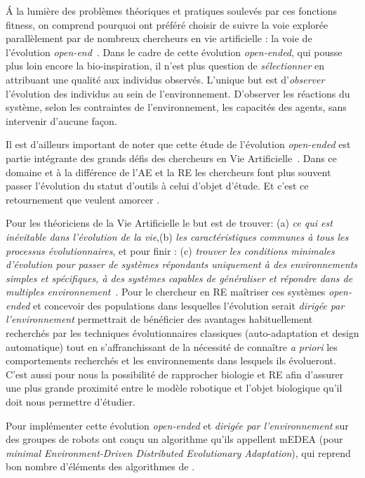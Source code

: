 \'A la lumière des problèmes théoriques et pratiques soulevés par ces fonctions fitness, on comprend pourquoi \cite{bredeche2012environmentdrivenopenende} ont préféré choisir de suivre la voie explorée parallèlement par de nombreux chercheurs en vie artificielle : la voie de l'évolution \emph{open-end}~\citep{ray91anapproachtothesynthesisoflife,adami94evolutionarylearninginthe2Dartificiallifesystemavida}. Dans le cadre de cette évolution \emph{open-ended}, qui pousse plus loin encore la bio-inspiration, il n'est plus question de \emph{sélectionner} en attribuant une qualité aux individus observés. L'unique but est d'\emph{observer} l'évolution des individus au sein de l'environnement. D'observer les réactions du système, selon les contraintes de l'environnement, les capacités des agents, sans intervenir d'aucune fa\c con.

Il est d'ailleurs important de noter que cette étude de l'évolution \emph{open-ended} est partie intégrante des grands défis des chercheurs en Vie Artificielle~\citep{bedau2000openproblemsinartificiallife}. Dans ce domaine et à la différence de l'AE et la RE les chercheurs font plus souvent passer l'évolution du statut d'outils à celui d'objet d'étude. Et c'est ce retournement que veulent amorcer \cite{bredeche11mcmds}.

Pour les théoriciens de la Vie Artificielle le but est de trouver: (a) \emph{ce qui est inévitable dans l'évolution de la vie},(b) \emph{les caractéristiques communes à tous les processus évolutionnaires}, et pour finir : (c) \emph{trouver les conditions minimales d'évolution pour passer de systèmes répondants uniquement à des environnements simples et spécifiques, à des systèmes capables de généraliser et répondre dans de multiples environnement}~\citep[voir respectivement les chapitres 3.6, 3.10 et 3.7 ]{bedau2000openproblemsinartificiallife}.
Pour le chercheur en RE maîtriser ces systèmes \emph{open-ended} et concevoir des populations dans lesquelles l'évolution serait \emph{dirigée par l'environnement} permettrait de bénéficier des avantages habituellement recherchés par les techniques évolutionnaires classiques (auto-adaptation et design automatique) tout en s'affranchissant de la nécessité de connaître \emph{a priori} les comportements recherchés et les environnements dans lesquels ils évolueront. C'est aussi pour nous la possibilité de rapprocher biologie et RE afin d'assurer une plus grande proximité entre le modèle robotique et l'objet biologique qu'il doit nous permettre d'étudier.

Pour implémenter cette évolution \emph{open-ended} et \emph{dirigée par l'environnement} sur des groupes de robots \cite{bredeche11mcmds} ont conçu un algorithme qu'ils appellent mEDEA (pour \emph{minimal Environment-Driven Distributed Evolutionary Adaptation}), qui reprend bon nombre d'éléments des algorithmes de \cite{watson02embodiedevolutiondistributingevolutionaryalgorithmpopulationrobots}.

